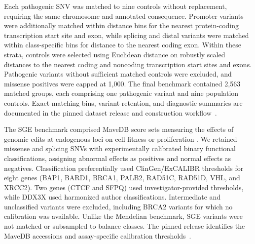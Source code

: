 \documentclass[a4paper,num-refs]{oup-contemporary}
\begin{document}
Each pathogenic SNV was matched to nine controls without replacement,
requiring the same chromosome and annotated consequence.
Promoter variants were additionally matched within distance bins
for the nearest protein-coding transcription start site and exon,
while splicing and distal variants were matched within class-specific
bins for distance to the nearest coding exon.
Within these strata, controls were selected using Euclidean distance
on robustly scaled distances to the nearest coding and noncoding
transcription start sites and exons.
Pathogenic variants without sufficient matched controls were excluded,
and missense positives were capped at 1,000.
The final benchmark contained 2,563 matched groups, each comprising
one pathogenic variant and nine population controls.
Exact matching bins, variant retention, and diagnostic summaries
are documented in the pinned dataset release and construction
workflow~\citep{mendeliancard,marindnabenchbuilder}.

The SGE benchmark comprised MaveDB score sets measuring the effects
of genomic edits at endogenous loci on cell fitness or proliferation
\citep{findlay2018sge,esposito2019mavedb,sgebenchcard}.
We retained missense and splicing SNVs with experimentally calibrated
binary functional classifications, assigning abnormal effects as
positives and normal effects as negatives.
Classification preferentially used ClinGen/ExCALIBR thresholds for
eight genes (BAP1, BARD1, BRCA1, PALB2, RAD51C, RAD51D, VHL, and
XRCC2). Two genes (CTCF and SFPQ) used investigator-provided
thresholds, while DDX3X used harmonized author classifications.
Intermediate and unclassified variants were excluded, including
BRCA2 variants for which no calibration was available.
Unlike the Mendelian benchmark, SGE variants were not matched or
subsampled to balance classes.
The pinned release identifies the MaveDB accessions and
assay-specific calibration thresholds~\citep{sgebenchcard}.
\end{document}
